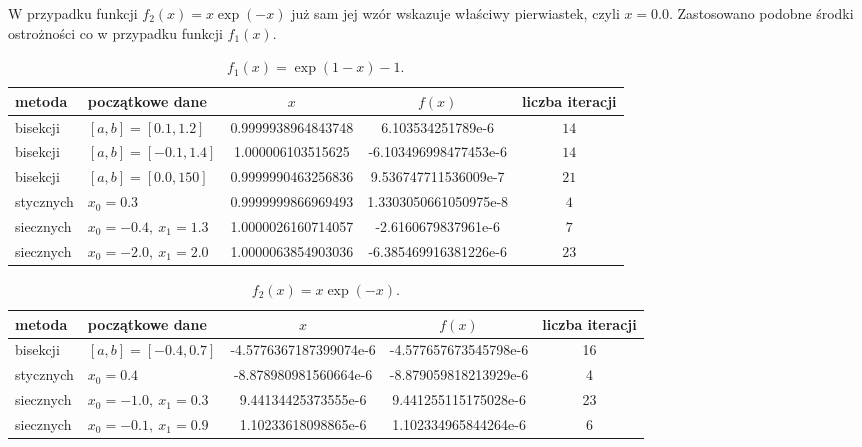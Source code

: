 \documentclass{classrep}
\begin{document}
			W przypadku funkcji $f_2(x)=x\exp(-x)$ już sam jej wzór wskazuje właściwy pierwiastek, czyli $x=0.0$. Zastosowano podobne środki ostrożności co w przypadku funkcji $f_1(x)$.
		\begin{table}[!hpbt]
        		\centering
        		\footnotesize
			\begin{tabular}{llSSc} \toprule
				{metoda} & {początkowe dane} &{$x$} & {$f(x)$} & {liczba iteracji}\\ \midrule
				bisekcji & $[a,b]=[0.1,1.2]$ & 0.9999938964843748 & 6.103534251789e-6 & $14$ \\ 
				bisekcji & $[a,b]=[-0.1,1.4]$ & 1.000006103515625 & -6.103496998477453e-6 & $14$ \\ 
				bisekcji & $[a,b]=[0.0,150]$ & 0.9999990463256836 & 9.536747711536009e-7 & $21$ \\
	 			stycznych & $x_0=0.3$ & 0.9999999866969493 & 1.3303050661050975e-8 & $4$ \\
	 			siecznych & $x_0=-0.4,~x_1=1.3$ & 1.0000026160714057 & -2.6160679837961e-6 & $7$ \\ 
	 			siecznych & $x_0=-2.0,~x_1=2.0$ & 1.0000063854903036 & -6.385469916381226e-6 & $23$ \\ \bottomrule
	 		\end{tabular}
	 		\caption{$f_1(x)=\exp(1-x)-1$.}
			\label{table:3}
		\end{table}
		
		\begin{table}[!hpbt]
        		\centering
        		\footnotesize
			\begin{tabular}{llSSc} \toprule
				{metoda} & {początkowe dane} &{$x$} & {$f(x)$} & {liczba iteracji}\\ \midrule
				bisekcji & $[a,b]=[-0.4,0.7]$ & -4.5776367187399074e-6 & -4.577657673545798e-6 & 16 \\ 
	 			stycznych & $x_0=0.4$ & -8.878980981560664e-6 & -8.879059818213929e-6 & 4 \\  	
	 			siecznych & $x_0=-1.0,~x_1=0.3$ & 9.44134425373555e-6 & 9.441255115175028e-6 & 23 \\
	 			siecznych & $x_0=-0.1,~x_1=0.9$ & 1.10233618098865e-6 & 1.102334965844264e-6 & 6 \\ \bottomrule
	 		\end{tabular}
	 		\caption{$f_2(x)=x\exp(-x)$.}
			\label{table:4}			
		\end{table}	
\end{document}
